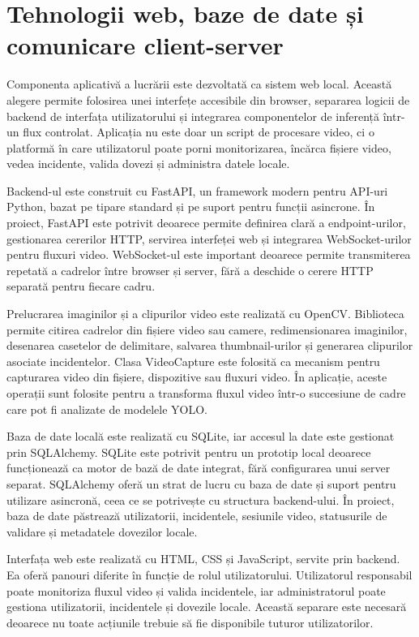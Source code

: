 \section{Tehnologii web, baze de date și comunicare client-server}

Componenta aplicativă a lucrării este dezvoltată ca sistem web local. Această alegere permite folosirea unei interfețe accesibile din browser, separarea logicii de backend de interfața utilizatorului și integrarea componentelor de inferență într-un flux controlat. Aplicația nu este doar un script de procesare video, ci o platformă în care utilizatorul poate porni monitorizarea, încărca fișiere video, vedea incidente, valida dovezi și administra datele locale.

Backend-ul este construit cu FastAPI, un framework modern pentru API-uri Python, bazat pe tipare standard și pe suport pentru funcții asincrone. În proiect, FastAPI este potrivit deoarece permite definirea clară a endpoint-urilor, gestionarea cererilor HTTP, servirea interfeței web și integrarea WebSocket-urilor pentru fluxuri video. WebSocket-ul este important deoarece permite transmiterea repetată a cadrelor între browser și server, fără a deschide o cerere HTTP separată pentru fiecare cadru.

Prelucrarea imaginilor și a clipurilor video este realizată cu OpenCV. Biblioteca permite citirea cadrelor din fișiere video sau camere, redimensionarea imaginilor, desenarea casetelor de delimitare, salvarea thumbnail-urilor și generarea clipurilor asociate incidentelor. Clasa VideoCapture este folosită ca mecanism pentru capturarea video din fișiere, dispozitive sau fluxuri video. În aplicație, aceste operații sunt folosite pentru a transforma fluxul video într-o succesiune de cadre care pot fi analizate de modelele YOLO.

Baza de date locală este realizată cu SQLite, iar accesul la date este gestionat prin SQLAlchemy. SQLite este potrivit pentru un prototip local deoarece funcționează ca motor de bază de date integrat, fără configurarea unui server separat. SQLAlchemy oferă un strat de lucru cu baza de date și suport pentru utilizare asincronă, ceea ce se potrivește cu structura backend-ului. În proiect, baza de date păstrează utilizatorii, incidentele, sesiunile video, statusurile de validare și metadatele dovezilor locale.

Interfața web este realizată cu HTML, CSS și JavaScript, servite prin backend. Ea oferă panouri diferite în funcție de rolul utilizatorului. Utilizatorul responsabil poate monitoriza fluxul video și valida incidentele, iar administratorul poate gestiona utilizatorii, incidentele și dovezile locale. Această separare este necesară deoarece nu toate acțiunile trebuie să fie disponibile tuturor utilizatorilor.

